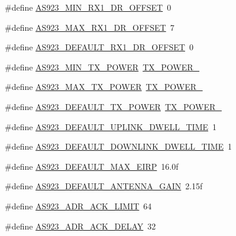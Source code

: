 \begin{DoxyCompactItemize}
\item 
\#define \hyperlink{group__REGIONAS923_gaaa342c4c9e6db79d8949112c19f7422f}{A\+S923\+\_\+\+M\+I\+N\+\_\+\+R\+X1\+\_\+\+D\+R\+\_\+\+O\+F\+F\+S\+ET}~0
\item 
\#define \hyperlink{group__REGIONAS923_ga92034d0c71c7943562cbebd114ed6f5e}{A\+S923\+\_\+\+M\+A\+X\+\_\+\+R\+X1\+\_\+\+D\+R\+\_\+\+O\+F\+F\+S\+ET}~7
\item 
\#define \hyperlink{group__REGIONAS923_ga2c6ea009afd46f07baae802b336ff76d}{A\+S923\+\_\+\+D\+E\+F\+A\+U\+L\+T\+\_\+\+R\+X1\+\_\+\+D\+R\+\_\+\+O\+F\+F\+S\+ET}~0
\item 
\#define \hyperlink{group__REGIONAS923_gab5c796398b9a3a599d43ce34dd0e3dec}{A\+S923\+\_\+\+M\+I\+N\+\_\+\+T\+X\+\_\+\+P\+O\+W\+ER}~\hyperlink{group__REGION_ga3c7bd9a98f0c1e7e9aaa90857c4bd700}{T\+X\+\_\+\+P\+O\+W\+E\+R\+\_}
\item 
\#define \hyperlink{group__REGIONAS923_ga572944e6a8933722a954e4cee98fa0ee}{A\+S923\+\_\+\+M\+A\+X\+\_\+\+T\+X\+\_\+\+P\+O\+W\+ER}~\hyperlink{group__REGION_gab33618449f2a573142c463ab071ef8ed}{T\+X\+\_\+\+P\+O\+W\+E\+R\+\_}
\item 
\#define \hyperlink{group__REGIONAS923_ga98e64bdbc74253fbec5119d43ceb5903}{A\+S923\+\_\+\+D\+E\+F\+A\+U\+L\+T\+\_\+\+T\+X\+\_\+\+P\+O\+W\+ER}~\hyperlink{group__REGION_gab33618449f2a573142c463ab071ef8ed}{T\+X\+\_\+\+P\+O\+W\+E\+R\+\_}
\item 
\#define \hyperlink{group__REGIONAS923_gafaa21368b605c5313a0c3ac76bfd908c}{A\+S923\+\_\+\+D\+E\+F\+A\+U\+L\+T\+\_\+\+U\+P\+L\+I\+N\+K\+\_\+\+D\+W\+E\+L\+L\+\_\+\+T\+I\+ME}~1
\item 
\#define \hyperlink{group__REGIONAS923_gab7c581030f301fc7ada92555da15ad23}{A\+S923\+\_\+\+D\+E\+F\+A\+U\+L\+T\+\_\+\+D\+O\+W\+N\+L\+I\+N\+K\+\_\+\+D\+W\+E\+L\+L\+\_\+\+T\+I\+ME}~1
\item 
\#define \hyperlink{group__REGIONAS923_ga626ba6fc6eb81535fe6f325a4ec47b90}{A\+S923\+\_\+\+D\+E\+F\+A\+U\+L\+T\+\_\+\+M\+A\+X\+\_\+\+E\+I\+RP}~16.\+0f
\item 
\#define \hyperlink{group__REGIONAS923_ga4a2faf56603f9d0feb2c105632a5b005}{A\+S923\+\_\+\+D\+E\+F\+A\+U\+L\+T\+\_\+\+A\+N\+T\+E\+N\+N\+A\+\_\+\+G\+A\+IN}~2.\+15f
\item 
\#define \hyperlink{group__REGIONAS923_ga83b8b9ab4bab852209f471da8518bf2d}{A\+S923\+\_\+\+A\+D\+R\+\_\+\+A\+C\+K\+\_\+\+L\+I\+M\+IT}~64
\item 
\#define \hyperlink{group__REGIONAS923_ga77d7f3a0e26d3bfeded53fce115d5180}{A\+S923\+\_\+\+A\+D\+R\+\_\+\+A\+C\+K\+\_\+\+D\+E\+L\+AY}~32

\end{DoxyCompactItemize}
